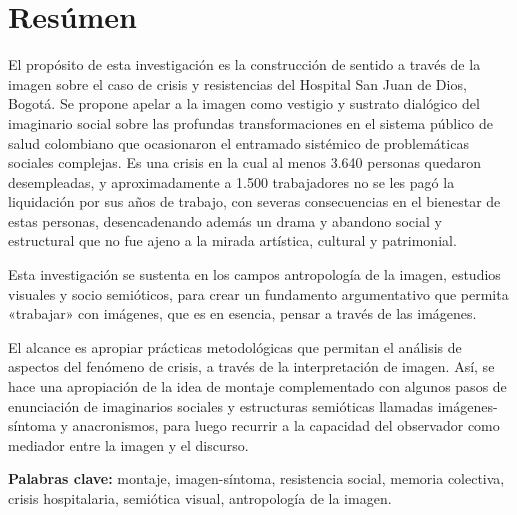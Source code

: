 \section*{Resúmen}
\setlength{\parskip}{1em}

El propósito de esta investigación es la construcción de sentido a través de la imagen sobre el caso de crisis y resistencias del Hospital San Juan de Dios, Bogotá. Se propone apelar a la imagen como vestigio y sustrato dialógico del imaginario social sobre las profundas transformaciones en el sistema público de salud colombiano que ocasionaron el entramado sistémico de problemáticas sociales complejas. Es una crisis en la cual al menos 3.640 personas quedaron desempleadas, y aproximadamente a 1.500 trabajadores no se les pagó la liquidación por sus años de trabajo, con severas consecuencias en el bienestar de estas personas, desencadenando además un drama y abandono social y estructural que no fue ajeno a la mirada artística, cultural y patrimonial.

Esta investigación se sustenta en los campos antropología de la imagen, estudios visuales y socio semióticos, para crear un fundamento argumentativo que permita «trabajar» con imágenes, que es en esencia, pensar a través de las imágenes.

El alcance es apropiar prácticas metodológicas que permitan el análisis de aspectos del fenómeno de crisis, a través de la interpretación de imagen. Así, se hace una apropiación de la idea de montaje complementado con algunos pasos de enunciación de imaginarios sociales y estructuras semióticas llamadas imágenes-síntoma y anacronismos, para luego recurrir a la capacidad del observador como mediador entre la imagen y el discurso.

\vspace{1cm}
\textbf{Palabras clave:} montaje, imagen-síntoma, resistencia social, memoria colectiva, crisis hospitalaria, semiótica visual, antropología de la imagen.
\pagebreak

